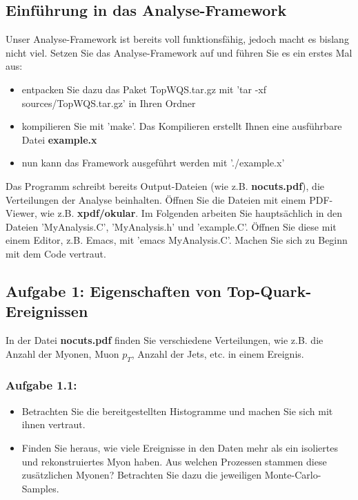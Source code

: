 \subsection{Einf\"uhrung in das Analyse-Framework}
Unser Analyse-Framework ist bereits voll funktionsf\"ahig, jedoch macht es bislang nicht viel. Setzen Sie das Analyse-Framework auf und f\"uhren Sie es ein erstes Mal aus:
\begin{itemize}
	\item entpacken Sie dazu das Paket TopWQS.tar.gz mit 'tar -xf sources/TopWQS.tar.gz' in Ihren Ordner
	\item kompilieren Sie mit 'make'. Das Kompilieren erstellt Ihnen eine ausf\"uhrbare Datei \textbf{example.x}
	\item nun kann das Framework ausgef\"uhrt werden mit './example.x'
\end{itemize}
Das Programm schreibt bereits Output-Dateien (wie z.B. \textbf{nocuts.pdf}), die Verteilungen der Analyse beinhalten. \"Offnen Sie die Dateien mit einem PDF-Viewer, wie z.B. \textbf{xpdf/okular}. Im Folgenden arbeiten Sie haupts\"achlich in den Dateien 'MyAnalysis.C', 'MyAnalysis.h' und 'example.C'. \"Offnen Sie diese mit einem Editor, z.B. Emacs, mit 'emacs MyAnalysis.C'. Machen Sie sich zu Beginn mit dem Code vertraut.

\subsection{Aufgabe 1: Eigenschaften von Top-Quark-Ereignissen}
In der Datei \textbf{nocuts.pdf} finden Sie verschiedene Verteilungen, wie z.B. die Anzahl der Myonen, Muon $p_{T}$, Anzahl der Jets, etc. in einem Ereignis. \\
\subsubsection{Aufgabe 1.1:}
\begin{itemize}
  \item Betrachten Sie die bereitgestellten Histogramme und machen Sie sich mit ihnen vertraut.
  \item Finden Sie heraus, wie viele Ereignisse in den Daten mehr als ein isoliertes und rekonstruiertes Myon haben. Aus welchen Prozessen stammen diese zus\"atzlichen Myonen? Betrachten Sie dazu die jeweiligen Monte-Carlo-Samples.
\end{itemize}
